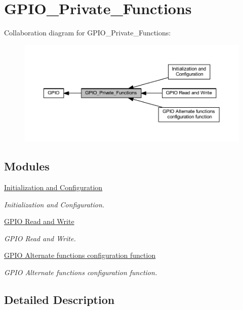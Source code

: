 \hypertarget{group___g_p_i_o___private___functions}{}\section{G\+P\+I\+O\+\_\+\+Private\+\_\+\+Functions}
\label{group___g_p_i_o___private___functions}
Collaboration diagram for G\+P\+I\+O\+\_\+\+Private\+\_\+\+Functions\+:\nopagebreak
\begin{figure}[H]
\begin{center}
\leavevmode
\includegraphics[width=350pt]{group___g_p_i_o___private___functions}
\end{center}
\end{figure}
\subsection*{Modules}
\begin{DoxyCompactItemize}
\item 
\hyperlink{group___g_p_i_o___group1}{Initialization and Configuration}
\begin{DoxyCompactList}\small\item\em Initialization and Configuration. \end{DoxyCompactList}\item 
\hyperlink{group___g_p_i_o___group2}{G\+P\+I\+O Read and Write}
\begin{DoxyCompactList}\small\item\em G\+P\+IO Read and Write. \end{DoxyCompactList}\item 
\hyperlink{group___g_p_i_o___group3}{G\+P\+I\+O Alternate functions configuration function}
\begin{DoxyCompactList}\small\item\em G\+P\+IO Alternate functions configuration function. \end{DoxyCompactList}\end{DoxyCompactItemize}


\subsection{Detailed Description}
